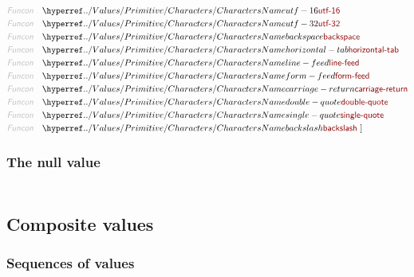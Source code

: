 \begin{align*}
  \KEY{Funcon} \quad & \NAMEHYPER{../Values/Primitive}{Characters}{utf-16} \\
  \KEY{Funcon} \quad & \NAMEHYPER{../Values/Primitive}{Characters}{utf-32} \\
  \KEY{Funcon} \quad & \NAMEHYPER{../Values/Primitive}{Characters}{backspace} \\
  \KEY{Funcon} \quad & \NAMEHYPER{../Values/Primitive}{Characters}{horizontal-tab} \\
  \KEY{Funcon} \quad & \NAMEHYPER{../Values/Primitive}{Characters}{line-feed} \\
  \KEY{Funcon} \quad & \NAMEHYPER{../Values/Primitive}{Characters}{form-feed} \\
  \KEY{Funcon} \quad & \NAMEHYPER{../Values/Primitive}{Characters}{carriage-return} \\
  \KEY{Funcon} \quad & \NAMEHYPER{../Values/Primitive}{Characters}{double-quote} \\
  \KEY{Funcon} \quad & \NAMEHYPER{../Values/Primitive}{Characters}{single-quote} \\
  \KEY{Funcon} \quad & \NAMEHYPER{../Values/Primitive}{Characters}{backslash}
  \ ]
\end{align*}
\subsubsection{The null value}\hypertarget{the-null-value}{}\label{the-null-value}

\begin{align*}
  [ \
  \KEY{Datatype} \quad & \NAMEHYPER{../Values/Primitive}{Null}{null-type} \\
  \KEY{Funcon} \quad & \NAMEHYPER{../Values/Primitive}{Null}{null-value} \\
  \KEY{Alias} \quad & \NAMEHYPER{../Values/Primitive}{Null}{null}
  \ ]
\end{align*}
\subsection{Composite values}\hypertarget{composite-values}{}\label{composite-values}

\subsubsection{Sequences of values}\hypertarget{sequences-of-values}{}\label{sequences-of-values}

